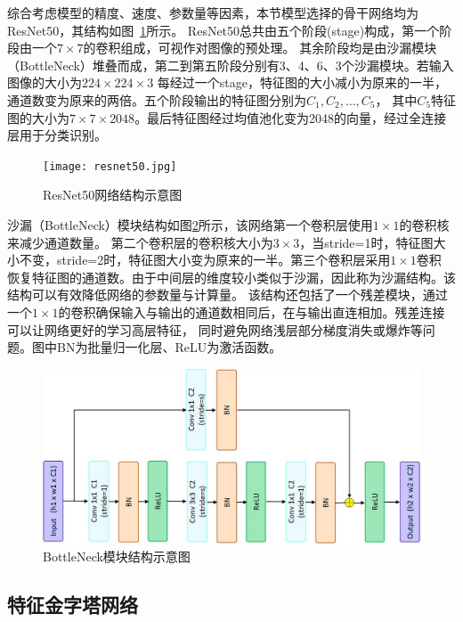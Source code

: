 综合考虑模型的精度、速度、参数量等因素，本节模型选择的骨干网络均为ResNet50，其结构如图~\ref{fig:resnet50}所示。
ResNet50总共由五个阶段(stage)构成，第一个阶段由一个$7\times7$的卷积组成，可视作对图像的预处理。
其余阶段均是由沙漏模块（BottleNeck）堆叠而成，第二到第五阶段分别有3、4、6、3个沙漏模块。若输入图像的大小为$224\times224\times3$
每经过一个stage，特征图的大小减小为原来的一半，通道数变为原来的两倍。五个阶段输出的特征图分别为$C_1, C_2, \dots, C_5$，
其中$C_5$特征图的大小为$7\times7\times2048$。最后特征图经过均值池化变为2048的向量，经过全连接层用于分类识别。

\begin{figure}[htbp]      
  \centering       
  \texttt{[image: resnet50.jpg]}       
  \caption{ResNet50网络结构示意图}       
  \label{fig:resnet50}  
\end{figure}   

沙漏（BottleNeck）模块结构如图\ref{fig:bottleneck}所示，该网络第一个卷积层使用$1\times1$的卷积核来减少通道数量。
第二个卷积层的卷积核大小为$3\times3$，当stride=1时，特征图大小不变，stride=2时，特征图大小变为原来的一半。第三个卷积层采用$1\times1$卷积
恢复特征图的通道数。由于中间层的维度较小类似于沙漏，因此称为沙漏结构。该结构可以有效降低网络的参数量与计算量。
该结构还包括了一个残差模块，通过一个$1\times1$的卷积确保输入与输出的通道数相同后，在与输出直连相加。残差连接可以让网络更好的学习高层特征，
同时避免网络浅层部分梯度消失或爆炸等问题。图中BN为批量归一化层、ReLU为激活函数。

\begin{figure}[htbp]        
  \centering          
  \includegraphics[width=0.7\linewidth]{bottleneck.jpg}          
  \caption{BottleNeck模块结构示意图}          
  \label{fig:bottleneck}   
\end{figure}    

\subsection{特征金字塔网络}

